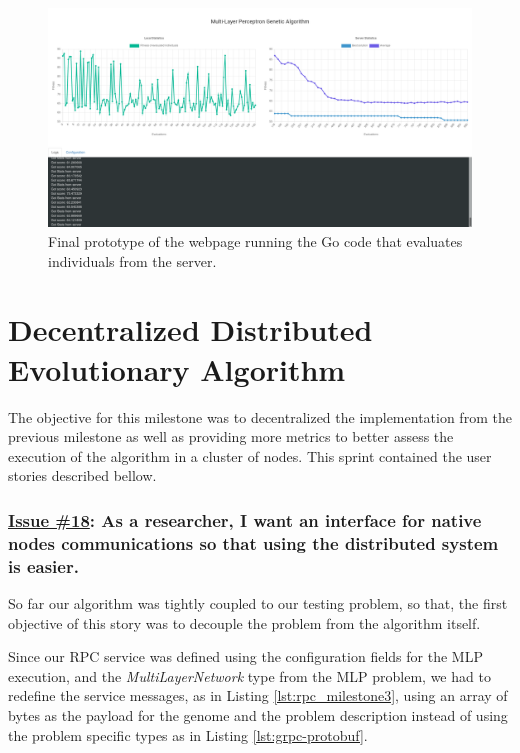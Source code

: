 \begin{figure}[h!]
		\centering
    	\includegraphics[width=\linewidth]{assets/images/web-milestone2.png}
    	\caption{Final prototype of the webpage running the Go code that evaluates individuals from the server.}
    	\label{image:web-milestone2}
\end{figure}

\section{Decentralized Distributed Evolutionary Algorithm}

The objective for this milestone was to decentralized the implementation from the previous milestone as well as providing more metrics to better assess the execution of the algorithm in a cluster of nodes. This sprint contained the user stories described bellow.

\subsubsection*{\href{https://github.com/salvacorts/TFG-Parasitic-Metaheuristics/issues/18}{Issue \#18}: As a researcher, I want an interface for native nodes communications so that using the distributed system is easier.}
So far our algorithm was tightly coupled to our testing problem, so that, the first objective of this story was to decouple the problem from the algorithm itself.

Since our RPC service was defined using the configuration fields for the MLP execution, and the \textit{MultiLayerNetwork} type from the MLP problem, we had to redefine the service messages, as in Listing \ref{lst:rpc_milestone3}, using an array of bytes as the payload for the genome and the problem description instead of using the problem specific types as in Listing \ref{lst:grpc-protobuf}.

